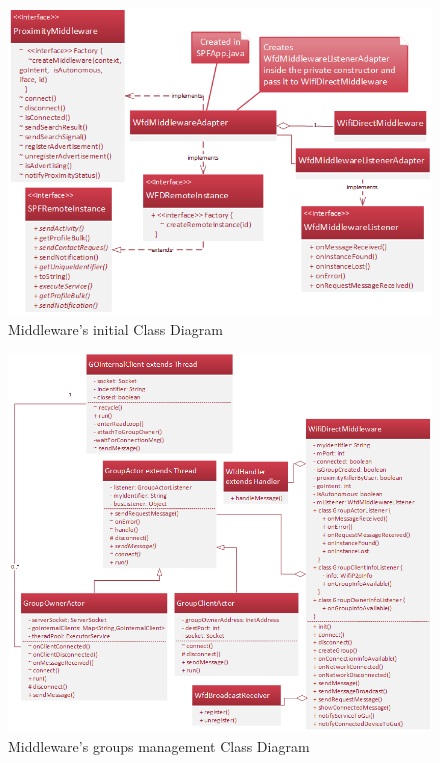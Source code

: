 \begin{figure}[thpb]
	\centering
	\includegraphics[scale=0.5]{./images/chap2/uml-parte1.png}
	\caption{Middleware's initial Class Diagram}
	\label{uml-part1}
\end{figure}	

\begin{figure}[thpb]
	\centering
	\includegraphics[scale=0.6]{./images/chap2/uml-parte2.png}
	\caption{Middleware's groups management Class Diagram}
	\label{uml-part2}
\end{figure}	


